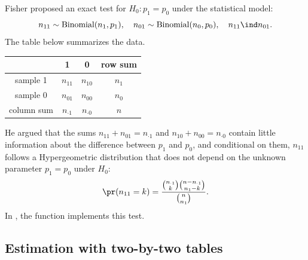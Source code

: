 Fisher  proposed an exact test for $H_0: p_1 = p_0$ under the statistical model: 
$$
n_{11} \sim \text{Binomial}(n_1, p_1),\quad
n_{01} \sim \text{Binomial}(n_0, p_0),\quad 
n_{11} \ind n_{01}.
$$
The table below summarizes the data.

\begin{center}
\begin{tabular}{cccc}
\hline 
 & 1 & 0 & row sum \\
 \hline 
sample 1 & $n_{11}$ & $n_{10}$ & $n_1$ \\
sample 0 & $n_{01}$ & $n_{00}$ & $n_0$ \\
column sum & $n_{\cdot 1}$ & $n_{\cdot 0}$ & $n$ \\
\hline 
\end{tabular}
\end{center}





He argued that the sums $n_{11}  + n_{01}  =  n_{\cdot 1}$ and $n_{10}  + n_{00}  =  n_{\cdot 0}$ contain little information about the difference between $p_1$ and $p_0$, and conditional on them, $n_{11}$  follows a  Hypergeometric distribution that does not depend on the unknown parameter $p_1=p_0$ under $H_0$:
$$
\pr(n_{11} = k )  = \frac{  \binom{ n_{\cdot 1} }{  k }  \binom{  n -  n_{\cdot 1} }{  n_1 - k   }  }{  \binom{  n }{ n_1 }  }.
$$
In , the function  implements this test. 



\subsection{Estimation with two-by-two tables}\label{section::asymptotic-inference-2x2}


